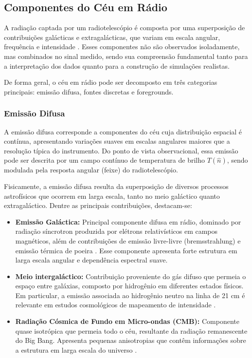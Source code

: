 \subsection{Componentes do Céu em Rádio}

A radiação captada por um radiotelescópio é composta por uma superposição de contribuições galácticas e extragalácticas, que variam em escala angular, frequência e intensidade \cite{mericia2019hi}. Esses componentes não são observados isoladamente, mas combinados no sinal medido, sendo sua compreensão fundamental tanto para a interpretação dos dados quanto para a construção de simulações realistas.

De forma geral, o céu em rádio pode ser decomposto em três categorias principais: emissão difusa, fontes discretas e foregrounds.

\subsubsection{Emissão Difusa}

A emissão difusa corresponde a componentes do céu cuja distribuição espacial é contínua, apresentando variações suaves em escalas angulares maiores que a resolução típica do instrumento. Do ponto de vista observacional, essa emissão pode ser descrita por um campo contínuo de temperatura de brilho $T(\hat{n})$, sendo modulada pela resposta angular (feixe) do radiotelescópio.

Fisicamente, a emissão difusa resulta da superposição de diversos processos astrofísicos que ocorrem em larga escala, tanto no meio galáctico quanto extragaláctico. Dentre as principais contribuições, destacam-se:

\begin{itemize}
    \item \textbf{Emissão Galáctica:} Principal componente difusa em rádio, dominado por radiação síncrotron produzida por elétrons relativísticos em campos magnéticos, além de contribuições de emissão livre-livre (bremsstrahlung) e emissão térmica de poeira \cite{ferrari2002emissao}. Esse componente apresenta forte estrutura em larga escala angular e dependência espectral suave.

    \item \textbf{Meio intergaláctico:} Contribuição proveniente do gás difuso que permeia o espaço entre galáxias, composto por hidrogênio em diferentes estados físicos. Em particular, a emissão associada ao hidrogênio neutro na linha de 21 cm é relevante em estudos cosmológicos de mapeamento de intensidade \cite{mendes2024dig}.

    \item \textbf{Radiação Cósmica de Fundo em Micro-ondas (CMB):} Componente quase isotrópica que permeia todo o céu, resultante da radiação remanescente do Big Bang. Apresenta pequenas anisotropias que contêm informações sobre a estrutura em larga escala do universo \cite{burke2019introduction}.
\end{itemize}

